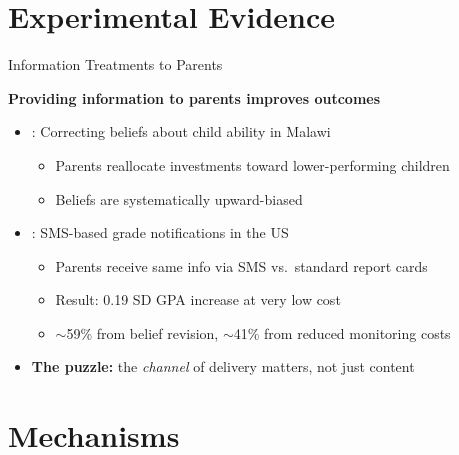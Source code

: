 \documentclass[aspectratio=169,11pt]{beamer}
\begin{document}
\section{Experimental Evidence}

\begin{frame}{Information Treatments to Parents}

\textbf{Providing information to parents improves outcomes}

\begin{itemize}
    \item \citet{dizonross2019parents}: Correcting beliefs about child ability in Malawi
    \begin{itemize}
        \item Parents reallocate investments toward lower-performing children
        \item Beliefs are systematically upward-biased
    \end{itemize}

    \bigskip

    \item \citet{bergman2021information}: SMS-based grade notifications in the US
    \begin{itemize}
        \item Parents receive same info via SMS vs.\ standard report cards
        \item Result: 0.19 SD GPA increase at very low cost
        \item $\sim$59\% from belief revision, $\sim$41\% from reduced monitoring costs
    \end{itemize}

    \bigskip

    \item \textbf{The puzzle:} the \emph{channel} of delivery matters, not just content
\end{itemize}

\end{frame}

\section{Mechanisms}
\end{document}
